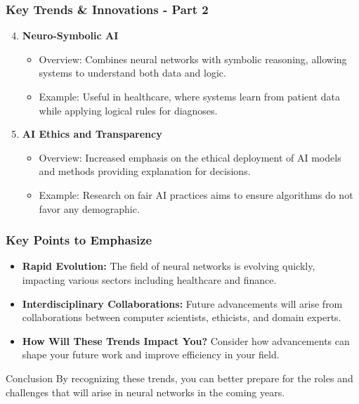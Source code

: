 \documentclass[aspectratio=169]{beamer}
\begin{document}
\begin{frame}[fragile]
    \frametitle{Key Trends \& Innovations - Part 2}
    \begin{enumerate}
        \setcounter{enumi}{3}
        \item \textbf{Neuro-Symbolic AI}
        \begin{itemize}
            \item Overview: Combines neural networks with symbolic reasoning, allowing systems to understand both data and logic.
            \item Example: Useful in healthcare, where systems learn from patient data while applying logical rules for diagnoses.
        \end{itemize}

        \item \textbf{AI Ethics and Transparency}
        \begin{itemize}
            \item Overview: Increased emphasis on the ethical deployment of AI models and methods providing explanation for decisions.
            \item Example: Research on fair AI practices aims to ensure algorithms do not favor any demographic.
        \end{itemize}
    \end{enumerate}
\end{frame}

\begin{frame}[fragile]
    \frametitle{Key Points to Emphasize}
    \begin{itemize}
        \item \textbf{Rapid Evolution:} The field of neural networks is evolving quickly, impacting various sectors including healthcare and finance.
        \item \textbf{Interdisciplinary Collaborations:} Future advancements will arise from collaborations between computer scientists, ethicists, and domain experts.
        \item \textbf{How Will These Trends Impact You?} Consider how advancements can shape your future work and improve efficiency in your field.
    \end{itemize}
    \begin{block}{Conclusion}
        By recognizing these trends, you can better prepare for the roles and challenges that will arise in neural networks in the coming years.
    \end{block}
\end{frame}
\end{document}
